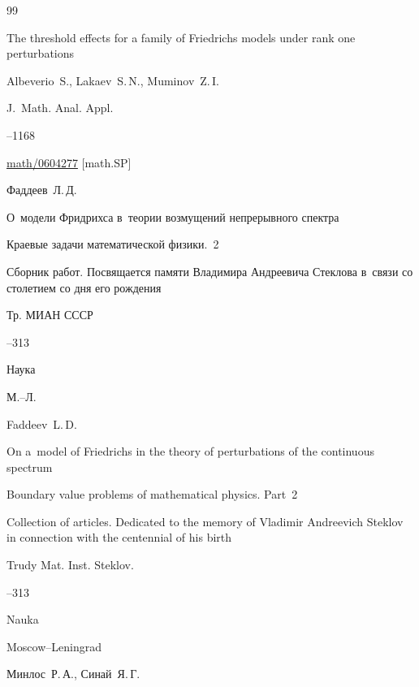 \begin{thebibliography}{99}

\paper The threshold effects for a family of Friedrichs models under rank one perturbations 

\by Albeverio~S., Lakaev~S.\,N., Muminov~Z.\,I.

\jour J.~Math. Anal. Appl.




--1168

\arxiv \href{http://arxiv.org/abs/math/0604277}{math/0604277} [math.SP]




\by Фаддеев~Л.\,Д.

\paper О~модели Фридрихса в~теории возмущений непрерывного спектра

\inbook Краевые задачи математической физики.~2

\bookinfo Сборник работ. Посвящается памяти Владимира Андреевича Стеклова в~связи со столетием со дня его рождения

\serial Тр. МИАН СССР



--313

\publ Наука

\publaddr М.--Л.

\misctransl

\by Faddeev~L.\,D.

\paper On a~model of Friedrichs in the theory of perturbations of the continuous spectrum

\inbook Boundary value problems of mathematical physics. Part~2

\bookinfo Collection of articles. Dedicated to the memory of Vladimir Andreevich Steklov in connection with the centennial of his birth

\serial Trudy Mat. Inst. Steklov.



--313

\publ Nauka

\publaddr Moscow--Leningrad




\by Минлос~Р.\,А., Синай~Я.\,Г.


\end{thebibliography}
